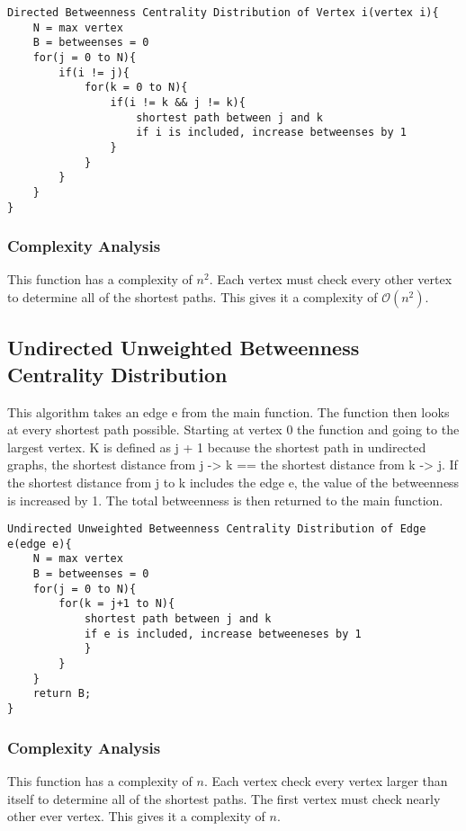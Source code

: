 \documentclass{article}
\begin{document}
\begin{verbatim}
Directed Betweenness Centrality Distribution of Vertex i(vertex i){
    N = max vertex
    B = betweenses = 0
    for(j = 0 to N){
        if(i != j){
            for(k = 0 to N){
                if(i != k && j != k){
                    shortest path between j and k
                    if i is included, increase betweenses by 1
                }
            }
        }
    }
}
\end{verbatim}

\subsubsection{Complexity Analysis}
This function has a complexity of $n^2$. Each vertex must check every other vertex to determine
all of the shortest paths. This gives it a complexity of $\mathcal{O}(n^2)$.

\subsection{Undirected Unweighted Betweenness Centrality Distribution}
This algorithm takes an edge e from the main function. The function then looks at every shortest path possible. Starting at vertex 0 the function and going to the largest vertex. K is defined as j + 1 because the shortest path in undirected graphs, the shortest distance from j -> k == the shortest distance from k -> j. If the shortest distance from j to k includes the edge e, the value of the betweenness is increased by 1. The total betweenness is then returned to the main function.

\begin{verbatim}
Undirected Unweighted Betweenness Centrality Distribution of Edge e(edge e){
    N = max vertex
    B = betweenses = 0
    for(j = 0 to N){
        for(k = j+1 to N){
            shortest path between j and k
            if e is included, increase betweeneses by 1
            }
        }
    }
    return B;
}
\end{verbatim}

\subsubsection{Complexity Analysis}
This function has a complexity of $n$. Each vertex check every vertex larger than itself to determine all of the shortest paths. The first vertex must check nearly other ever vertex. This gives it a complexity of $n$.
\end{document}
